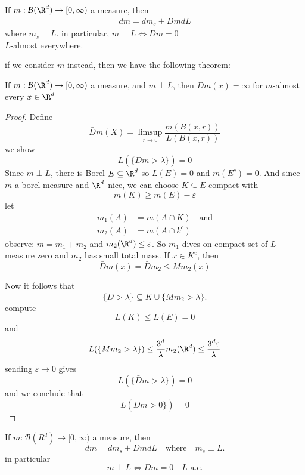 \begin{corollary}
	If $m : \mathcal{B}(\R^d) \to [0, \infty)$ a measure, then
	\begin{align*}
		dm = dm_{s} + Dm dL
	\end{align*} where $m_s \perp L$. in particular, $m \perp L \iff Dm = 0$ \\
	$L$-almost everywhere.
\end{corollary}

\begin{remark}
	if we consider $m$ instead, then we have the following theorem:
\end{remark}

\begin{theorem}
	If $m : \mathcal{B}(\R^d) \to [0, \infty)$ a measure, and $m \perp L$, then $D m(x) = \infty$ for $m$-almost every $x \in \R^d$
\end{theorem}

\begin{proof}
	Define
	\[
		\bar{D} m(X) = \limsup_{r \to 0} \frac{m(B(x,r))}{L(B(x,r))}
	\] we show 
	\[
		L(\{ \bar{D} m > \lambda \} ) = 0
	\] 
	Since $m \perp L$, there is Borel $E \subseteq \R^d$ so $L(E) = 0$ and $m(E^c) = 0$.
	And since  $m$ a borel measure and $\R^d$ nice, we can choose $K \subseteq E$ compact with
	\[
		m(K) \geq m(E) - \varepsilon
	\]
	let
	\begin{align*}
		m_1 (A) &= m( A \cap K) \quad \text{and} \\
		m_2 (A) &= m(A \cap k^c)
	\end{align*} 
	observe: $m = m_1 + m_2$ and $m_2 (\R^d) \leq \varepsilon$.
	So $m_1$ dives on compact set of $L$-measure zero and $m_2$ has small total mass.
	If $x \in K^c$, then
	\[
		\bar{D} m(x) = \bar{D}m_2 \leq M m_2 (x)
	\] 

	Now it follows that
	\[
		\{ \bar{D} > \lambda \} \subseteq K \cup \{ M m_2 > \lambda \}.
	\] compute
	\[
		L(K) \leq L(E) = 0
	\] and
	\[
		L( \{M m_2 > \lambda \}) \leq \frac{3^d}{\lambda} m_2(\R^d) \leq \frac{3^d \varepsilon}{\lambda}
	\] sending $\varepsilon \to 0$ gives
	\[
		L( \{ \bar{D} m > \lambda \}) = 0
	\] and we conclude that
	\[
	L( \bar{D} m > 0 \}) = 0
	\] 
\end{proof}


\begin{corollary}
	If $m : \mathcal{B}(R^d) \to [0,\infty)$ a measure, then
	\[
		dm = dm_s + Dm dL \quad \text{where} \quad m_s \perp L.
	\] in particular
	\[
		m \perp L \iff D m=0 \quad L\text{-a.e.}
	\] 
\end{corollary}

